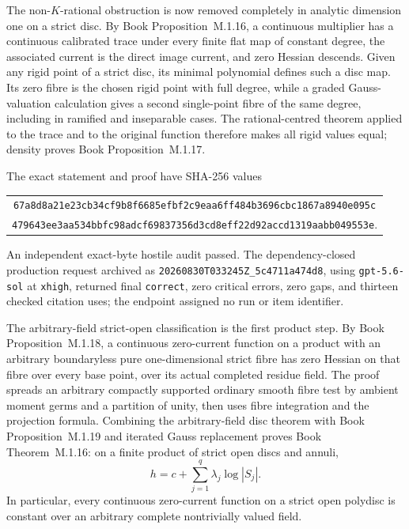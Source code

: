 \documentclass[11pt,a4paper]{article}
\theoremstyle{definition}
\theoremstyle{remark}
\begin{document}
The non-\(K\)-rational obstruction is now removed completely in analytic
dimension one on a strict disc.  By
Book Proposition~M.1.16, a continuous multiplier has a
continuous calibrated trace under every finite flat map of constant degree,
the associated current is the direct image current, and zero Hessian
descends.  Given any rigid point of a strict disc, its minimal polynomial
defines such a disc map.  Its zero fibre is the chosen rigid point with full
degree, while a graded Gauss-valuation calculation gives a second
single-point fibre of the same degree, including in ramified and inseparable
cases.  The rational-centred theorem applied to the trace and to the original
function therefore makes all rigid values equal; density proves
Book Proposition~M.1.17.

The exact statement and proof have SHA-256 values
\begin{center}
\small
\begin{tabular}{@{}c@{}}
\nolinkurl{67a8d8a21e23cb34cf9b8f6685efbf2c9eaa6ff484b3696cbc1867a8940e095c}\\
\nolinkurl{479643ee3aa534bbfc98adcf69837356d3cd8eff22d92accd1319aabb049553e}.
\end{tabular}
\end{center}
An independent exact-byte hostile audit passed.  The dependency-closed
production request archived as
\nolinkurl{20260830T033245Z_5c4711a474d8}, using
\texttt{gpt-5.6-sol} at \texttt{xhigh}, returned final
\texttt{correct}, zero critical errors, zero gaps, and thirteen checked
citation uses; the endpoint assigned no run or item identifier.

The arbitrary-field strict-open classification is the first product step.
By
Book Proposition~M.1.18, a continuous
zero-current function on a product with an arbitrary boundaryless pure
one-dimensional strict fibre has zero Hessian on that fibre over every base
point, over its actual completed residue field.  The proof spreads an
arbitrary compactly supported ordinary smooth fibre test by ambient moment
germs and a partition of unity, then uses fibre integration and the
projection formula.  Combining the arbitrary-field disc theorem with
Book Proposition~M.1.19 and iterated Gauss
replacement proves
Book Theorem~M.1.16: on a finite product
of strict open discs and annuli,
\[
                    h=c+\sum_{j=1}^{q}\lambda_j\log|S_j|.
\]
In particular, every continuous zero-current function on a strict open
polydisc is constant over an arbitrary complete nontrivially valued field.
\end{document}
